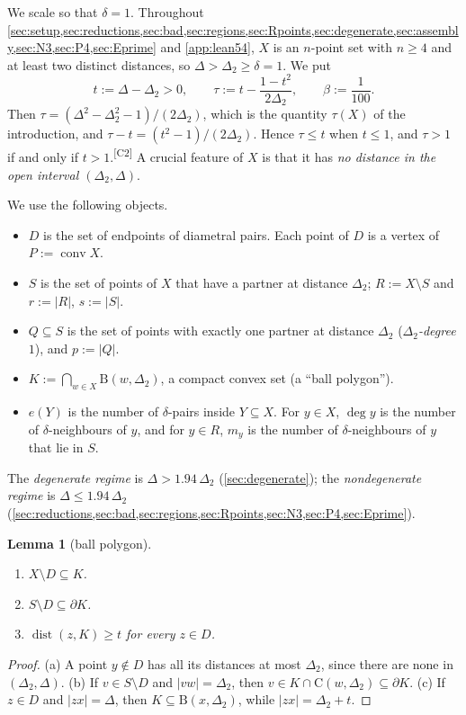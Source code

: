 \documentclass[11pt]{amsart}
\newtheorem{lemma}[theorem]{Lemma}
\theoremstyle{definition}
\theoremstyle{remark}
\newcommand{\Dt}{\Delta_2}
\newcommand{\conv}{\operatorname{conv}}
\newcommand{\dist}{\operatorname{dist}}
\newcommand{\Cc}{\mathrm{C}}      %
\newcommand{\Dd}{\mathrm{B}}      %
\newcommand{\chk}[1]{\textsuperscript{[#1]}}
\begin{document}
We scale so that $\delta=1$. Throughout \cref{sec:setup,sec:reductions,sec:bad,sec:regions,sec:Rpoints,sec:degenerate,sec:assembly,sec:N3,sec:P4,sec:Eprime} and \cref{app:lean54}, $X$ is an $n$-point set with $n\ge 4$ and at least two distinct distances, so $\Delta>\Dt\ge\delta=1$. We put
\[
t:=\Delta-\Dt>0,\qquad \tau:=t-\frac{1-t^2}{2\Dt},\qquad \beta:=\frac1{100}.
\]
Then $\tau=(\Delta^2-\Dt^2-1)/(2\Dt)$, which is the quantity $\tau(X)$ of the introduction, and $\tau-t=(t^2-1)/(2\Dt)$. Hence $\tau\le t$ when $t\le 1$, and $\tau>1$ if and only if $t>1$.\chk{C2} A crucial feature of $X$ is that it has \emph{no distance in the open interval $(\Dt,\Delta)$}.

We use the following objects.
\begin{itemize}[leftmargin=2em]
\item $D$ is the set of endpoints of diametral pairs. Each point of $D$ is a vertex of $P:=\conv X$.
\item $S$ is the set of points of $X$ that have a partner at distance $\Dt$; $R:=X\setminus S$ and $r:=|R|$, $s:=|S|$.
\item $Q\subseteq S$ is the set of points with exactly one partner at distance $\Dt$ (\emph{$\Dt$-degree} $1$), and $p:=|Q|$.
\item $K:=\bigcap_{w\in X}\Dd(w,\Dt)$, a compact convex set (a ``ball polygon'').
\item $e(Y)$ is the number of $\delta$-pairs inside $Y\subseteq X$. For $y\in X$, $\deg y$ is the number of $\delta$-neighbours of $y$, and for $y\in R$, $m_y$ is the number of $\delta$-neighbours of $y$ that lie in $S$.
\end{itemize}
The \emph{degenerate regime} is $\Delta>1.94\,\Dt$ (\cref{sec:degenerate}); the \emph{nondegenerate regime} is $\Delta\le 1.94\,\Dt$ (\cref{sec:reductions,sec:bad,sec:regions,sec:Rpoints,sec:N3,sec:P4,sec:Eprime}).

\begin{lemma}[ball polygon]\label{lem:ballpoly}
\begin{enumerate}[label=(\alph*)]
\item $X\setminus D\subseteq K$.
\item $S\setminus D\subseteq\partial K$.
\item $\dist(z,K)\ge t$ for every $z\in D$.
\end{enumerate}
\end{lemma}
\begin{proof}
(a) A point $y\notin D$ has all its distances at most $\Dt$, since there are none in $(\Dt,\Delta)$. (b) If $v\in S\setminus D$ and $|vw|=\Dt$, then $v\in K\cap \Cc(w,\Dt)\subseteq\partial K$. (c) If $z\in D$ and $|zx|=\Delta$, then $K\subseteq\Dd(x,\Dt)$, while $|zx|=\Dt+t$.
\end{proof}
\end{document}
